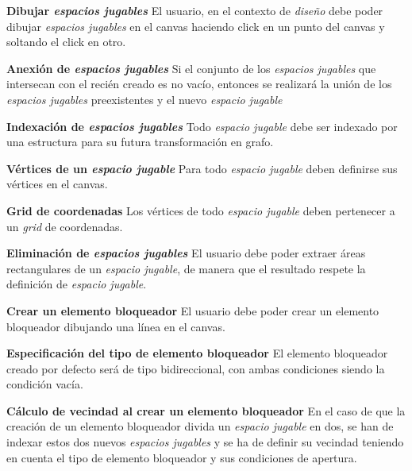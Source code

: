 	\item \textbf{Dibujar \textit{espacios jugables}}\newline
		El usuario, en el contexto de \textit{diseño} debe poder dibujar \textit{espacios jugables} en el canvas haciendo click en un punto del canvas y soltando el click en otro.
		\begin{functional}
			\item \textbf{Anexión de \textit{espacios jugables}}\newline
				Si el conjunto de los \textit{espacios jugables} que intersecan con el recién creado es no vacío, entonces se realizará la unión de los \textit{espacios jugables} preexistentes y el nuevo \textit{espacio jugable}
			\item \textbf{Indexación de \textit{espacios jugables}}\newline
				Todo \textit{espacio jugable} debe ser indexado por una estructura para su futura transformación en grafo.
			\item \textbf{Vértices de un \textit{espacio jugable}}\newline
				Para todo \textit{espacio jugable} deben definirse sus vértices en el canvas.
			\item \textbf{Grid de coordenadas}
				Los vértices de todo \textit{espacio jugable} deben pertenecer a un \textit{grid} de coordenadas.
		\end{functional}
	\item \textbf{Eliminación de \textit{espacios jugables}}\newline
		El usuario debe poder extraer áreas rectangulares de un \textit{espacio jugable}, de manera que el resultado respete la definición de \textit{espacio jugable}.
	\item \textbf{Crear un elemento bloqueador}\newline
		El usuario debe poder crear un elemento bloqueador dibujando una línea en el canvas.
		\begin{functional}
			\item \textbf{Especificación del tipo de elemento bloqueador}\newline
				El elemento bloqueador creado por defecto será de tipo bidireccional, con ambas condiciones siendo la condición vacía.
			\item \textbf{Cálculo de vecindad al crear un elemento bloqueador}\newline
				En el caso de que la creación de un elemento bloqueador divida un \textit{espacio jugable} en dos, se han de indexar estos dos nuevos \textit{espacios jugables} y se ha de definir su vecindad teniendo en cuenta el tipo de elemento bloqueador y sus condiciones de apertura.
		\end{functional}
